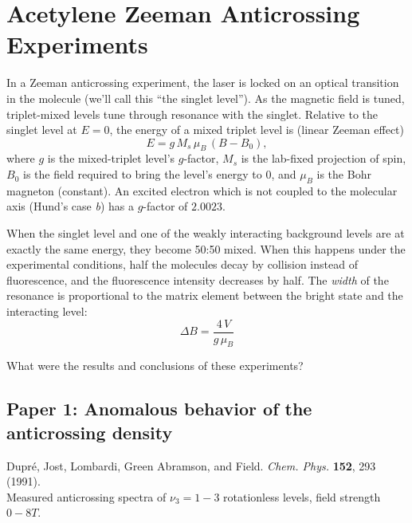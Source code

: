 \documentclass[12pt]{article}
\begin{document}
\section*{Acetylene Zeeman Anticrossing Experiments}

In a Zeeman anticrossing experiment, the laser is locked on an optical
transition in the molecule (we'll call this ``the singlet level'').
As the magnetic field is tuned, triplet-mixed levels tune through
resonance with the singlet.  Relative to the singlet level at
$E=0$, the energy of a mixed triplet level is (linear Zeeman effect)
\begin{equation}
E = g \, M_s \, \mu_B \, (B-B_0),
\end{equation}
where $g$ is the mixed-triplet level's $g$-factor, $M_s$ is the
lab-fixed projection of spin, $B_0$ is the field required to bring the
level's energy to 0, and $\mu_B$ is the Bohr magneton (constant).  An
excited electron which is not coupled to the molecular axis (Hund's
case \emph{b}) has a $g$-factor of $2.0023$.

When the singlet level and one of the weakly interacting background
levels are at exactly the same energy, they become 50:50 mixed.  When
this happens under the experimental conditions, half the molecules
decay by collision instead of fluorescence, and the fluorescence
intensity decreases by half.  The \emph{width} of the resonance is
proportional to the matrix element between the bright state and the
interacting level:
\begin{equation}
\Delta B = \frac{4\,V}{g\,\mu_B}
\end{equation}

What were the results and conclusions of these experiments?

\subsection*{Paper 1: Anomalous behavior of the anticrossing density}

Dupr\'{e}, Jost, Lombardi, Green Abramson, and Field.
\emph{Chem. Phys.}  \textbf{152}, 293 (1991).\\
Measured anticrossing spectra of $\nu_3=1-3$ rotationless levels,
field strength $0-8T$.
\end{document}
